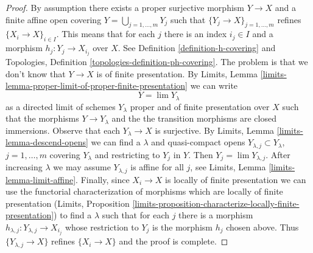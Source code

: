\documentclass[10pt,a4paper]{amsart}
\theoremstyle{plain}
\theoremstyle{definition}
\theoremstyle{remark}
\numberwithin{equation}{subsection}
\def\lim{\mathop{\mathrm{lim}}\nolimits}
\begin{document}
\begin{proof}
By assumption there exists a proper surjective morphism
$Y \to X$ and a finite affine open covering
$Y = \bigcup_{j = 1, \ldots, m} Y_j$ such that
$\{Y_j \to X\}_{j = 1, \ldots, m}$ refines $\{X_i \to X\}_{i \in I}$.
This means that for each $j$ there is an index $i_j \in I$
and a morphism $h_j : Y_j \to X_{i_j}$ over $X$.
See Definition \ref{definition-h-covering} and
Topologies, Definition \ref{topologies-definition-ph-covering}.
The problem is that we don't know that $Y \to X$ is of finite
presentation.
By
Limits, Lemma \ref{limits-lemma-proper-limit-of-proper-finite-presentation}
we can write
$$
Y = \lim Y_\lambda
$$
as a directed limit of schemes $Y_\lambda$ proper and of finite presentation
over $X$ such that the morphisms $Y \to Y_\lambda$ and the
the transition morphisms are closed immersions. Observe that
each $Y_\lambda \to X$ is surjective.
By Limits, Lemma \ref{limits-lemma-descend-opens}
we can find a $\lambda$ and quasi-compact opens
$Y_{\lambda, j} \subset Y_\lambda$, $j = 1, \ldots, m$
covering $Y_\lambda$ and restricting to $Y_j$ in $Y$.
Then $Y_j = \lim Y_{\lambda, j}$.
After increasing $\lambda$ we may assume $Y_{\lambda, j}$
is affine for all $j$, see
Limits, Lemma \ref{limits-lemma-limit-affine}.
Finally, since $X_i \to X$ is locally of finite presentation
we can use the functorial characterization of morphisms
which are locally of finite presentation
(Limits, Proposition
\ref{limits-proposition-characterize-locally-finite-presentation})
to find a $\lambda$ such that for each $j$ there is
a morphism $h_{\lambda, j} : Y_{\lambda, j} \to X_{i_j}$
whose restriction to $Y_j$ is the morphism $h_j$ chosen above.
Thus $\{Y_{\lambda, j} \to X\}$ refines
$\{X_i \to X\}$ and the proof is complete.
\end{proof}
\end{document}
